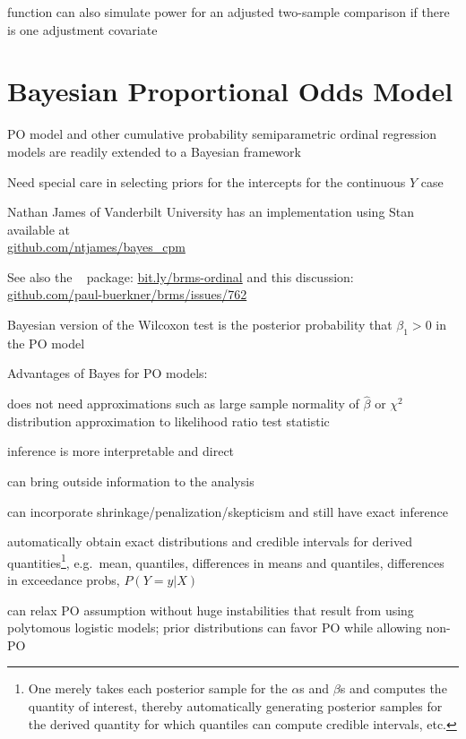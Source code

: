 \item {}  function can also simulate power for an adjusted two-sample comparison if there is one adjustment covariate
\ei

\section{Bayesian Proportional Odds Model}
\bi
\item PO model and other cumulative probability semiparametric ordinal regression models are readily extended to a Bayesian framework
\item Need special care in selecting priors for the intercepts for the continuous $Y$ case
\item Nathan James of Vanderbilt University has an implementation using Stan available at\\
\href{https://github.com/ntjames/bayes\_cpm}{github.com/ntjames/bayes\_cpm}
\item See also the \R\  package: \href{http://bit.ly/brms-ordinal}{bit.ly/brms-ordinal} and this discussion:\\ \href{http://github.com/paul-buerkner/brms/issues/762}{github.com/paul-buerkner/brms/issues/762}
\item Bayesian version of the Wilcoxon test is the posterior probability that $\beta_1 > 0$ in the PO model
\item Advantages of Bayes for PO models:
 \bi
 \item does not need approximations such as large sample normality of $\hat{\beta}$ or $\chi^{2}$ distribution approximation to likelihood ratio test statistic
 \item inference is more interpretable and direct
 \item can bring outside information to the analysis
 \item can incorporate shrinkage/penalization/skepticism and still have exact inference
 \item automatically obtain exact distributions and credible intervals for derived quantities\footnote{One merely takes each posterior sample for the $\alpha$s and $\beta$s and computes the quantity of interest, thereby automatically generating posterior samples for the derived quantity for which quantiles can compute credible intervals, etc.}, e.g.\ mean, quantiles, differences in means and quantiles, differences in exceedance probs, $P(Y=y | X)$
 \item can relax PO assumption without huge instabilities that result from using polytomous logistic models; prior distributions can favor PO while allowing non-PO
 \ei
\ei
